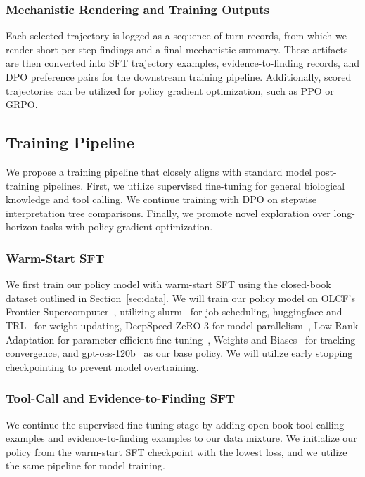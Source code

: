 \documentclass[thesis,letterpaper,12pt]{utthesis}
\begin{document}
\subsubsection{Mechanistic Rendering and Training Outputs}
Each selected trajectory is logged as a sequence of turn records, from which we render short per-step findings and a final mechanistic summary. These artifacts are then converted into SFT trajectory examples, evidence-to-finding records, and DPO preference pairs for the downstream training pipeline. Additionally, scored trajectories can be utilized for policy gradient optimization, such as PPO or GRPO.

\subsection{Training Pipeline}\label{sec:training}
We propose a training pipeline that closely aligns with standard model post-training pipelines. First, we utilize supervised fine-tuning for general biological knowledge and tool calling. We continue training with DPO on stepwise interpretation tree comparisons. Finally, we promote novel exploration over long-horizon tasks with policy gradient optimization.

\subsubsection{Warm-Start SFT}\label{sec:warmstart}
We first train our policy model with warm-start SFT using the closed-book dataset outlined in Section~\ref{sec:data}. We will train our policy model on OLCF's Frontier Supercomputer~\cite{frontier}, utilizing slurm~\cite{slurm} for job scheduling, huggingface and TRL~\cite{trl} for weight updating, DeepSpeed ZeRO-3 for model parallelism~\cite{deepspeed}, Low-Rank Adaptation for parameter-efficient fine-tuning~\cite{hu2022lora}, Weights and Biases~\cite{wandb} for tracking convergence, and gpt-oss-120b~\cite{gpt-oss} as our base policy. We will utilize early stopping checkpointing to prevent model overtraining.

\subsubsection{Tool-Call and Evidence-to-Finding SFT}
We continue the supervised fine-tuning stage by adding open-book tool calling examples and evidence-to-finding examples to our data mixture. We initialize our policy from the warm-start SFT checkpoint with the lowest loss, and we utilize the same pipeline for model training.
\end{document}

